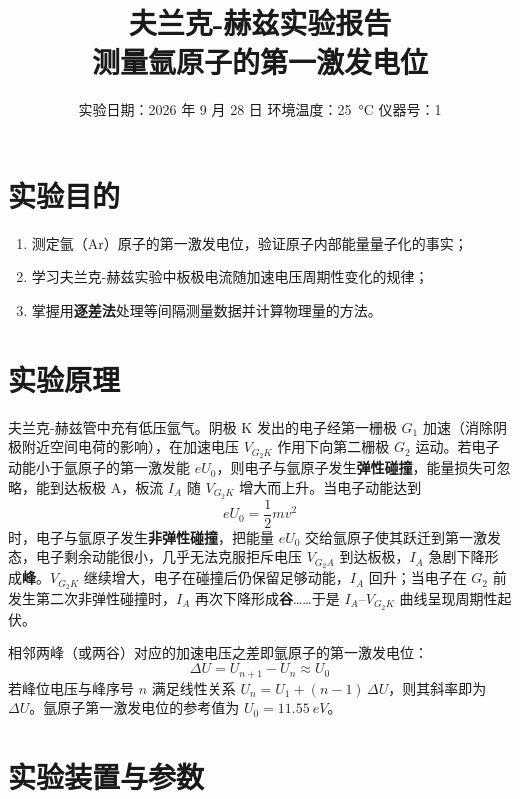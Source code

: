\documentclass[12pt, a4paper]{ctexart}
\title{\textbf{夫兰克-赫兹实验报告}\\ \large 测量氩原子的第一激发电位}
\author{}
\date{实验日期：2026 年 9 月 28 日 \quad 环境温度：\SI{25}{\celsius} \quad 仪器号：1}
\begin{document}
\maketitle

\section{实验目的}

\begin{enumerate}
    \item 测定氩（Ar）原子的第一激发电位，验证原子内部能量量子化的事实；
    \item 学习夫兰克-赫兹实验中板极电流随加速电压周期性变化的规律；
    \item 掌握用\textbf{逐差法}处理等间隔测量数据并计算物理量的方法。
\end{enumerate}

\section{实验原理}

夫兰克-赫兹管中充有低压氩气。阴极 K 发出的电子经第一栅极 $G_1$ 加速（消除阴极附近空间电荷的影响），在加速电压 $V_{G_2K}$ 作用下向第二栅极 $G_2$ 运动。若电子动能小于氩原子的第一激发能 $eU_0$，则电子与氩原子发生\textbf{弹性碰撞}，能量损失可忽略，能到达板极 A，板流 $I_A$ 随 $V_{G_2K}$ 增大而上升。当电子动能达到
\begin{equation}
    eU_0 = \frac{1}{2}mv^2
\end{equation}
时，电子与氩原子发生\textbf{非弹性碰撞}，把能量 $eU_0$ 交给氩原子使其跃迁到第一激发态，电子剩余动能很小，几乎无法克服拒斥电压 $V_{G_2A}$ 到达板极，$I_A$ 急剧下降形成\textbf{峰}。$V_{G_2K}$ 继续增大，电子在碰撞后仍保留足够动能，$I_A$ 回升；当电子在 $G_2$ 前发生第二次非弹性碰撞时，$I_A$ 再次下降形成\textbf{谷}……于是 $I_A$--$V_{G_2K}$ 曲线呈现周期性起伏。

相邻两峰（或两谷）对应的加速电压之差即氩原子的第一激发电位：
\begin{equation}
    \Delta U = U_{n+1} - U_n \approx U_0
\end{equation}
若峰位电压与峰序号 $n$ 满足线性关系 $U_n = U_1 + (n-1)\,\Delta U$，则其斜率即为 $\Delta U$。氩原子第一激发电位的参考值为 $U_0 = \SI{11.55}{eV}$。

\section{实验装置与参数}
\end{document}
